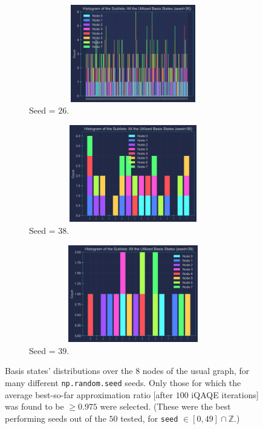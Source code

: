 
\clearpage

\begin{figure}[ht!]
  \addtocounter{figure}{-1} %
  \centering
  \begin{subfigure}[t]{0.325\textwidth}
      \addtocounter{subfigure}{2} %
      \centering
      \includegraphics[width=1\textwidth,height=4.25cm]{Figures/Chapter_5/Random iQAQE (Coloured plots)/8-node(seed=26).png}
      \caption{Seed = $26$.}
      \label{fig:seed=26}
  \end{subfigure}
  \hfill
  \begin{subfigure}[t]{0.325\textwidth}
      \centering
      \includegraphics[width=1\textwidth,height=4.25cm]{Figures/Chapter_5/Random iQAQE (Coloured plots)/8-node(seed=38).png}
      \caption{Seed = $38$.}
      \label{fig:seed=38}
  \end{subfigure}
  \hfill
  \begin{subfigure}[t]{0.325\textwidth}
      \centering
      \includegraphics[width=1\textwidth,height=4.25cm]{Figures/Chapter_5/Random iQAQE (Coloured plots)/8-node(seed=39).png}
      \caption{Seed = $39$.}
      \label{fig:seed=39}
  \end{subfigure}
  \caption{Basis states' distributions over the $8$ nodes of the usual graph, for many different \texttt{np.random.seed} seeds. Only those for which the average best-so-far approximation ratio [after $100$ iQAQE iterations] was found to be $\geq 0.975$ were selected. (These were the best performing seeds out of the $50$ tested, for \texttt{seed} $\in \left[0, 49\right] \cap \mathbb{Z}$.)}
  \label{fig:Random_iQAQE(Seeds)}
\end{figure}

